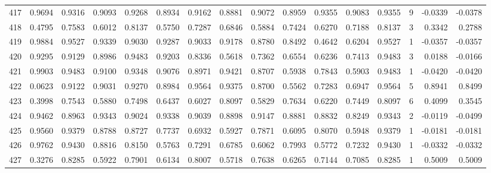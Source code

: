 \begin{tabular}{lrrrrrrrrrrrrrrr}
417 &      0.9694 &  0.9316 &  0.9093 &  0.9268 &  0.8934 &  0.9162 &  0.8881 &  0.9072 &  0.8959 &  0.9355 &   0.9083 &     0.9355 &      9 &                   -0.0339 &                    -0.0378 \\
418 &      0.4795 &  0.7583 &  0.6012 &  0.8137 &  0.5750 &  0.7287 &  0.6846 &  0.5884 &  0.7424 &  0.6270 &   0.7188 &     0.8137 &      3 &                    0.3342 &                     0.2788 \\
419 &      0.9884 &  0.9527 &  0.9339 &  0.9030 &  0.9287 &  0.9033 &  0.9178 &  0.8780 &  0.8492 &  0.4642 &   0.6204 &     0.9527 &      1 &                   -0.0357 &                    -0.0357 \\
420 &      0.9295 &  0.9129 &  0.8986 &  0.9483 &  0.9203 &  0.8336 &  0.5618 &  0.7362 &  0.6554 &  0.6236 &   0.7413 &     0.9483 &      3 &                    0.0188 &                    -0.0166 \\
421 &      0.9903 &  0.9483 &  0.9100 &  0.9348 &  0.9076 &  0.8971 &  0.9421 &  0.8707 &  0.5938 &  0.7843 &   0.5903 &     0.9483 &      1 &                   -0.0420 &                    -0.0420 \\
422 &      0.0623 &  0.9122 &  0.9031 &  0.9270 &  0.8984 &  0.9564 &  0.9375 &  0.8700 &  0.5562 &  0.7283 &   0.6947 &     0.9564 &      5 &                    0.8941 &                     0.8499 \\
423 &      0.3998 &  0.7543 &  0.5880 &  0.7498 &  0.6437 &  0.6027 &  0.8097 &  0.5829 &  0.7634 &  0.6220 &   0.7449 &     0.8097 &      6 &                    0.4099 &                     0.3545 \\
424 &      0.9462 &  0.8963 &  0.9343 &  0.9024 &  0.9338 &  0.9039 &  0.8898 &  0.9147 &  0.8881 &  0.8832 &   0.8249 &     0.9343 &      2 &                   -0.0119 &                    -0.0499 \\
425 &      0.9560 &  0.9379 &  0.8788 &  0.8727 &  0.7737 &  0.6932 &  0.5927 &  0.7871 &  0.6095 &  0.8070 &   0.5948 &     0.9379 &      1 &                   -0.0181 &                    -0.0181 \\
426 &      0.9762 &  0.9430 &  0.8816 &  0.8150 &  0.5763 &  0.7291 &  0.6785 &  0.6062 &  0.7993 &  0.5772 &   0.7232 &     0.9430 &      1 &                   -0.0332 &                    -0.0332 \\
427 &      0.3276 &  0.8285 &  0.5922 &  0.7901 &  0.6134 &  0.8007 &  0.5718 &  0.7638 &  0.6265 &  0.7144 &   0.7085 &     0.8285 &      1 &                    0.5009 &                     0.5009 \\

\end{tabular}
